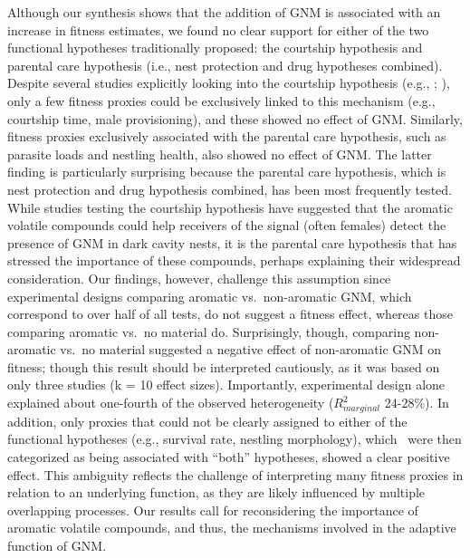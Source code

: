 \documentclass[
  number,
  review,
  onecolumn]{elsarticle}
\begin{document}
Although our synthesis shows that the addition of GNM is associated with
an increase in fitness estimates, we found no clear support for either
of the two functional hypotheses traditionally proposed: the courtship
hypothesis and parental care hypothesis (i.e., nest protection and drug
hypotheses combined). Despite several studies explicitly looking into
the courtship hypothesis (e.g., \citep{lopez-rull2009};
\citep{tomás2013}), only a few fitness proxies could be exclusively
linked to this mechanism (e.g., courtship time, male provisioning), and
these showed no effect of GNM. Similarly, fitness proxies exclusively
associated with the parental care hypothesis, such as parasite loads and
nestling health, also showed no effect of GNM. The latter finding is
particularly surprising because the parental care hypothesis, which is
nest protection and drug hypothesis combined, has been most frequently
tested. While studies testing the courtship hypothesis have suggested
that the aromatic volatile compounds could help receivers of the signal
(often females) detect the presence of GNM in dark cavity nests, it is
the parental care hypothesis that has stressed the importance of these
compounds, perhaps explaining their widespread consideration. Our
findings, however, challenge this assumption since experimental designs
comparing aromatic vs.~non-aromatic GNM, which correspond to over half
of all tests, do not suggest a fitness effect, whereas those comparing
aromatic vs.~no material do. Surprisingly, though, comparing
non-aromatic vs.~no material suggested a negative effect of non-aromatic
GNM on fitness; though this result should be interpreted cautiously, as
it was based on only three studies (k = 10 effect sizes). Importantly,
experimental design alone explained about one-fourth of the observed
heterogeneity (\(R^2_{marginal}\) 24-28\%). In addition, only proxies
that could not be clearly assigned to either of the functional
hypotheses (e.g., survival rate, nestling morphology), which~ were then
categorized as being associated with ``both'' hypotheses, showed a clear
positive effect. This ambiguity reflects the challenge of interpreting
many fitness proxies in relation to an underlying function, as they are
likely influenced by multiple overlapping processes. Our results call
for reconsidering the importance of aromatic volatile compounds, and
thus, the mechanisms involved in the adaptive function of GNM.
\end{document}
